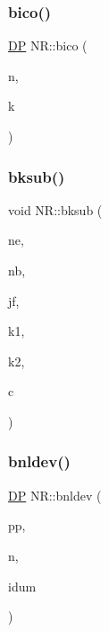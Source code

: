 \mbox{\label{namespaceNR_a35306d0e713b54e50ad6bfdeca55d162}} 
\subsubsection{\texorpdfstring{bico()}{bico()}}
{\footnotesize\ttfamily \mbox{\hyperlink{namespaceNR_af6ff762dd605ff477b8e52387253a02a}{DP}} N\+R\+::bico (\begin{DoxyParamCaption}\item[{const int}]{n,  }\item[{const int}]{k }\end{DoxyParamCaption})}

\mbox{\label{namespaceNR_a16bf04bccb961bc7c1f0a1aa65d849ea}} 
\subsubsection{\texorpdfstring{bksub()}{bksub()}}
{\footnotesize\ttfamily void N\+R\+::bksub (\begin{DoxyParamCaption}\item[{const int}]{ne,  }\item[{const int}]{nb,  }\item[{const int}]{jf,  }\item[{const int}]{k1,  }\item[{const int}]{k2,  }\item[{\mbox{\hyperlink{namespaceNR_ae2c061d1bcce9ea856c905d761956d76}{Mat3\+D\+\_\+\+I\+O\+\_\+\+DP}} \&}]{c }\end{DoxyParamCaption})}

\mbox{\label{namespaceNR_aa9a538f63c380caf2e72b8d6f4bdbe3e}} 
\subsubsection{\texorpdfstring{bnldev()}{bnldev()}}
{\footnotesize\ttfamily \mbox{\hyperlink{namespaceNR_af6ff762dd605ff477b8e52387253a02a}{DP}} N\+R\+::bnldev (\begin{DoxyParamCaption}\item[{const \mbox{\hyperlink{namespaceNR_af6ff762dd605ff477b8e52387253a02a}{DP}}}]{pp,  }\item[{const int}]{n,  }\item[{int \&}]{idum }\end{DoxyParamCaption})}

